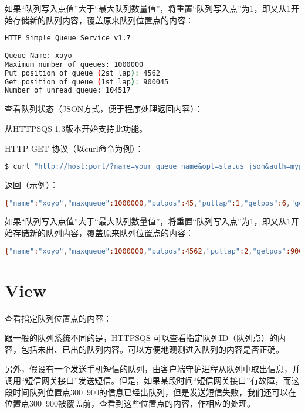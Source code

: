 如果“队列写入点值”大于“最大队列数量值”，将重置“队列写入点”为1，即又从1开始存储新的队列内容，覆盖原来队列位置点的内容：

\begin{lstlisting}[language=bash]
HTTP Simple Queue Service v1.7
------------------------------
Queue Name: xoyo
Maximum number of queues: 1000000
Put position of queue (2st lap): 4562
Get position of queue (1st lap): 900045
Number of unread queue: 104517
\end{lstlisting}




查看队列状态（JSON方式，便于程序处理返回内容）：

从HTTPSQS 1.3版本开始支持此功能。

HTTP GET 协议（以curl命令为例）：



\begin{lstlisting}[language=bash]
$ curl "http://host:port/?name=your_queue_name&opt=status_json&auth=mypass123"
\end{lstlisting}


返回（示例）：


\begin{lstlisting}[language=bash]
{"name":"xoyo","maxqueue":1000000,"putpos":45,"putlap":1,"getpos":6,"getlap":1,"unread":39}
\end{lstlisting}

如果“队列写入点值”大于“最大队列数量值”，将重置“队列写入点”为1，即又从1开始存储新的队列内容，覆盖原来队列位置点的内容：

\begin{lstlisting}[language=bash]
{"name":"xoyo","maxqueue":1000000,"putpos":4562,"putlap":2,"getpos":900045,"getlap":1,"unread":104517}
\end{lstlisting}


\section{View}


查看指定队列位置点的内容：

跟一般的队列系统不同的是，HTTPSQS 可以查看指定队列ID（队列点）的内容，包括未出、已出的队列内容。可以方便地观测进入队列的内容是否正确。

另外，假设有一个发送手机短信的队列，由客户端守护进程从队列中取出信息，并调用“短信网关接口”发送短信。但是，如果某段时间“短信网关接口”有故障，而这段时间队列位置点300~900的信息已经出队列，但是发送短信失败，我们还可以在位置点300~900被覆盖前，查看到这些位置点的内容，作相应的处理。

